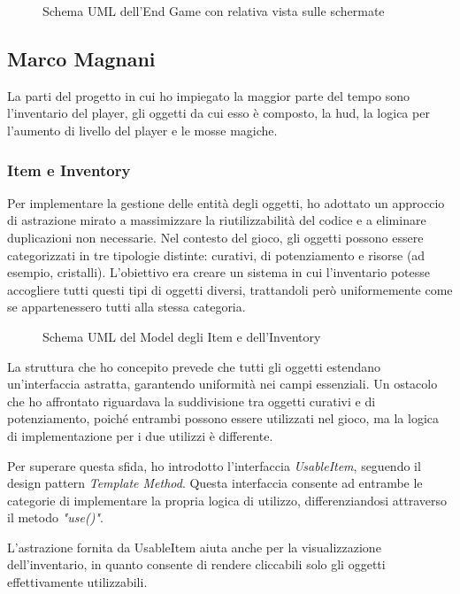 \documentclass[a4paper,12pt]{report}
\begin{document}
\begin{figure}[H]
	\centering
	
	\caption{Schema UML dell'End Game con relativa vista sulle schermate}
	\label{fig:the-exiled-victory_gameover-uml}
\end{figure}

\subsection{Marco Magnani}
La parti del progetto in cui ho impiegato la maggior parte del tempo sono l'inventario del player, gli oggetti da cui esso è composto, la hud, la logica per l'aumento di livello del player e le mosse magiche.

\subsubsection{Item e Inventory}

Per implementare la gestione delle entità degli oggetti, ho adottato un approccio di astrazione mirato a massimizzare la riutilizzabilità del codice e a eliminare duplicazioni non necessarie. Nel contesto del gioco, gli oggetti possono essere categorizzati in tre tipologie distinte: curativi, di potenziamento e risorse (ad esempio, cristalli).
L'obiettivo era creare un sistema in cui l'inventario potesse accogliere tutti questi tipi di oggetti diversi, trattandoli però uniformemente come se appartenessero tutti alla stessa categoria.
\begin{figure}[H]
	\centering
	
	\caption{Schema UML del Model degli Item e dell'Inventory}
	\label{fig:the-exiled-item-uml}
\end{figure}

La struttura che ho concepito prevede che tutti gli oggetti estendano un'interfaccia astratta, garantendo uniformità nei campi essenziali. Un ostacolo che ho affrontato riguardava la suddivisione tra oggetti curativi e di potenziamento, poiché entrambi possono essere utilizzati nel gioco, ma la logica di implementazione per i due utilizzi è differente.

Per superare questa sfida, ho introdotto l'interfaccia \textit{UsableItem}, seguendo il design pattern \textit{Template Method}. Questa interfaccia consente ad entrambe le categorie di implementare la propria logica di utilizzo, differenziandosi attraverso il metodo \textit{"use()"}.

L'astrazione fornita da UsableItem aiuta anche per la visualizzazione dell'inventario, in quanto consente di rendere cliccabili solo gli oggetti effettivamente utilizzabili.
\end{document}
